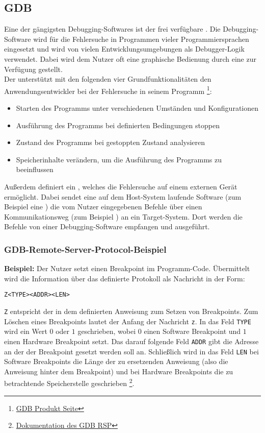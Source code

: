 	\subsection{GDB}
	\label{sec:gdb}
	Eine der gängigsten Debugging\hyp{}Softwares ist der frei verfügbare . Die Debugging\hyp{}Software
	wird für die Fehlersuche in Programmen vieler Programmiersprachen eingesetzt und wird von vielen
	Entwicklungsumgebungen als Debugger-Logik verwendet. Dabei wird dem Nutzer oft eine graphische Bedienung durch eine
	 zur Verfügung gestellt.\\

	Der  unterstützt mit den folgenden vier Grundfunktionalitäten den Anwendungsentwickler bei der Fehlersuche in
	seinem Programm
	\footnote{\href{https://sourceware.org/gdb/}{GDB Produkt Seite}}:
	\begin{itemize}
	    \item Starten des Programms unter verschiedenen Umständen und Konfigurationen
	    \item Ausführung des Programms bei definierten Bedingungen stoppen
	    \item Zustand des Programms bei gestoppten Zustand analysieren
	    \item Speicherinhalte verändern, um die Ausführung des Programms zu beeinflussen
	\end{itemize}

	Außerdem definiert  ein , welches die Fehlersuche auf einem externen Gerät
	ermöglicht. Dabei sendet eine auf dem Host-System laufende Software (zum Beispiel eine ) die vom Nutzer
	eingegebenen Befehle über einen Kommunikationsweg (zum Beispiel ) an ein Target-System. Dort werden die
	Befehle von einer Debugging-Software empfangen und ausgeführt.

	\subsubsection{GDB-Remote-Server-Protocol-Beispiel}
	\textbf{Beispiel:} Der Nutzer setzt einen Breakpoint im Programm-Code. Übermittelt wird die Information über das
	definierte Protokoll als Nachricht in der Form:\\
	\begin{Verbatim}[frame=single]
Z<TYPE><ADDR><LEN>
    \end{Verbatim}

    \texttt{Z} entspricht der in dem  definierten Anweisung zum Setzen von Breakpoints.
    Zum Löschen eines Breakpoints lautet der Anfang der Nachricht \texttt{z}. In das Feld \texttt{TYPE} wird ein Wert
    $0$ oder $1$ geschrieben, wobei $0$ einen Software Breakpoint und $1$ einen Hardware Breakpoint setzt. Das darauf folgende
    Feld \texttt{ADDR} gibt die Adresse an der der Breakpoint gesetzt werden soll an. Schließlich wird in das Feld
    \texttt{LEN} bei Software Breakpoints die Länge der zu ersetzenden Anweisung (also die Anweisung hinter dem
    Breakpoint) und bei Hardware Breakpoints die zu betrachtende Speicherstelle geschrieben
    \footnote{\href{http://davis.lbl.gov/Manuals/GDB/gdb_31.html}{Dokumentation des GDB RSP}}.

